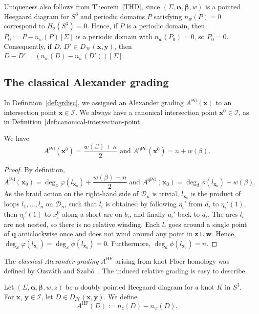 \documentclass[11pt]{amsart}
\numberwithin{equation}{section}
\numberwithin{figure}{section}
\theoremstyle{definition}
\newcommand{\cD}{\mathcal{D}}
\newcommand{\cH}{\mathcal{H}}
\newcommand{\cI}{\mathcal{I}}
\DeclareMathOperator{\HF}{HF}
\DeclareMathOperator{\Pd}{Pd}
\DeclareMathOperator{\qPd}{qPd}
\newcommand{\as}{\boldsymbol{\alpha}}
\newcommand{\bs}{\boldsymbol{\beta}}
\newcommand{\qs}{\boldsymbol{q}}
\newcommand{\ws}{\boldsymbol{w}}
\newcommand{\xs}{\boldsymbol{x}}
\newcommand{\ys}{\boldsymbol{y}}
\newcommand{\zs}{\boldsymbol{z}}
\begin{document}
\begin{rmk}\label{rmk:periodic}
    Uniqueness also follows from Theorem~\ref{THD}, since $(\Sigma,\as,\bs, w)$ is a pointed Heegaard diagram for $S^3$ and periodic domains $P$ satisfying $n_w(P) = 0$ correspond to $H_2(S^3) = 0$. Hence, if $P$ is a periodic domain, then $P_0 := P - n_w(P)[\Sigma]$ is a periodic domain with $n_w(P_0) = 0$, so $P_0 = 0$. Consequently, if $D$, $D' \in D_{\cH}(\xs,\ys)$, then $D-D' = (n_w(D)-n_w(D'))[\Sigma]$.
\end{rmk}

\subsection{The classical Alexander grading}\label{sec:gradings}
In Definition~\ref{def:grdisc}, we assigned an Alexander grading $A^{\Pd}(\xs)$ to an intersection point $\xs \in \cI$. We always have a canonical intersection point $\xs^0 \in \cI$, as in Definition~\ref{def:canonical-intersection-point}.

\begin{lem}\label{lem:canonical-grading}
    We have 
    \[
    A^{\Pd}(\xs^0)= \frac{w(\beta)+n}{2} \text{ and } A^{\qPd}(\xs^0) = n + w(\beta).
    \]
\end{lem}

\begin{proof}
    By definition, 
    \[
    A^{\Pd}(\xs_0) = \deg_x \varphi(l_{\xs_0}) + \frac{w(\beta)+n}{2} \text{ and } A^{\qPd}(\xs_0) = \deg_d \phi(l_{\xs_0}) + w(\beta).
    \]
    As the braid action on the right-hand side of $\cD_n$ is trivial, $l_{\xs_0}$ is the product of loops $l_1,\dots,l_n$ on $\cD_n$, such that $l_i$ is obtained by following $\eta_i'$ from $d_i$ to $\eta_i'(1)$, then $\eta_i'(1)$ to $x_i^0$ along a short arc on $b_i$, and finally $a_i'$ back to $d_i$. The arcs $l_i$ are not nested, so there is no relative winding. Each $l_i$ goes around a single point of $\qs$ anticlockwise once and does not wind around any point in $\zs \cup \ws$. Hence, $\deg_x \varphi(l_{\xs_0}) = \deg_x \phi(l_{\xs_0}) = 0$. Furthermore, $\deg_d \phi(l_{\xs_0}) = n$.
\end{proof}

The \emph{classical Alexander grading} $A^{\HF}$ arising from knot Floer homology was defined by Ozsv\'ath and Szab\'o~\cite{OS2}. The induced relative grading is easy to describe. 

\begin{defn}\label{def:Alex-HF}
Let $(\Sigma,\as,\bs, w, z)$ be a doubly pointed Heegaard diagram for a knot $K$ in $S^3$. For $\xs$, $\ys \in \cI$, let $D \in D_{\cH}(\xs, \ys)$. We define
\begin{equation}
A^{\HF}(D):= n_{z}(D)-n_{w}(D).
\end{equation}
\end{defn}
\end{document}
